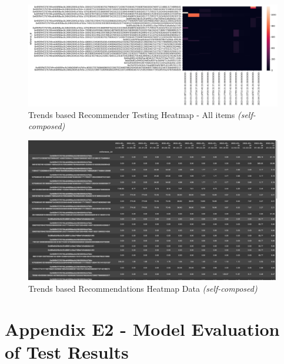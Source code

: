 \begin{figure}[h!]
\centering
\includegraphics[width=\textwidth]{images/Testing/trends/trends-heatmap-all.png}
\caption{Trends based Recommender Testing Heatmap - All items \textit{(self-composed)}}
\label{fig:trends-recsys-heatmap-all}
\end{figure}

\begin{figure}[h!]
\centering
\includegraphics[width=\textwidth]{images/Testing/trends/heatmap-data.png}
\caption{Trends based Recommendations Heatmap Data \textit{(self-composed)}}
\label{fig:trends-recsys-heatmap-data-matrix}
\end{figure}


\clearpage
\section*{Appendix E2 - Model Evaluation of Test Results}


